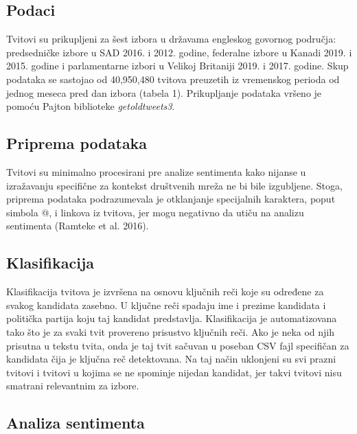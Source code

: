 \subsection{Podaci}

Tvitovi su prikupljeni za šest izbora u državama engleskog govornog područja: predsedničke izbore u
SAD 2016. i 2012. godine, federalne izbore u Kanadi 2019. i 2015. godine i parlamentarne izbori u
Velikoj Britaniji 2019. i 2017. godine. Skup podataka se sastojao od 40,950,480 tvitova preuzetih iz
vremenskog perioda od jednog meseca pred dan izbora (tabela 1). Prikupljanje podataka vršeno je
pomoću Pajton biblioteke \textit{getoldtweets3}.


\subsection{Priprema podataka}

Tvitovi su minimalno procesirani pre analize sentimenta kako nijanse u izražavanju specifične za
kontekst društvenih mreža ne bi bile izgubljene. Stoga, priprema podataka podrazumevala je
otklanjanje specijalnih karaktera, poput simbola @, i linkova iz tvitova, jer mogu negativno da utiču
na analizu sentimenta (Ramteke et al. 2016).

\subsection{Klasifikacija}

Klasifikacija tvitova je izvršena na osnovu ključnih reči koje su određene za svakog kandidata zasebno.
U ključne reči spadaju ime i prezime kandidata i politička partija koju taj kandidat predstavlja.
Klasifikacija je automatizovana tako što je za svaki tvit provereno prisustvo ključnih reči. Ako je neka
od njih prisutna u tekstu tvita, onda je taj tvit sačuvan u poseban CSV fajl specifičan za kandidata čija
je ključna reč detektovana. Na taj način uklonjeni su svi prazni tvitovi i tvitovi u kojima se ne spominje
nijedan kandidat, jer takvi tvitovi nisu smatrani relevantnim za izbore.

\subsection{Analiza sentimenta}

